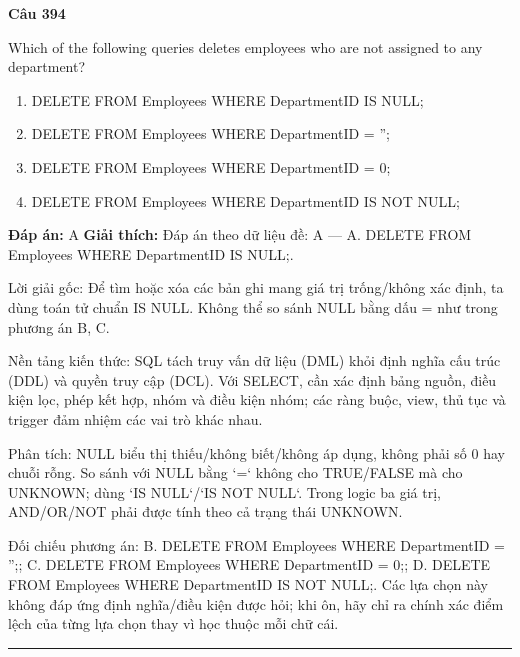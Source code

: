 \documentclass[11pt,a4paper]{article}
\newenvironment{question}[1]{%
  \par\vspace{1em}\noindent\textbf{\large Câu #1}\par\vspace{0.4em}
}{%
  \par\vspace{1em}\hrule\vspace{0.6em}
}
\newenvironment{choices}{%
  \begin{enumerate}[label=\textbf{\Alph*.},leftmargin=2.2em,itemsep=2pt,topsep=3pt]
}{%
  \end{enumerate}
}
\newcommand{\choice}{\item}
\begin{document}
\begin{question}{394}
Which of the following queries deletes employees who are not assigned to any department?
\begin{choices}
\choice DELETE FROM Employees WHERE DepartmentID IS NULL;
\choice DELETE FROM Employees WHERE DepartmentID = '';
\choice DELETE FROM Employees WHERE DepartmentID = 0;
\choice DELETE FROM Employees WHERE DepartmentID IS NOT NULL;
\end{choices}
\textbf{Đáp án:} A
\textbf{Giải thích:} Đáp án theo dữ liệu đề: A — A. DELETE FROM Employees WHERE DepartmentID IS NULL;.

Lời giải gốc: Để tìm hoặc xóa các bản ghi mang giá trị trống/không xác định, ta dùng toán tử chuẩn IS NULL. Không thể so sánh NULL bằng dấu = như trong phương án B, C.

Nền tảng kiến thức: SQL tách truy vấn dữ liệu (DML) khỏi định nghĩa cấu trúc (DDL) và quyền truy cập (DCL). Với SELECT, cần xác định bảng nguồn, điều kiện lọc, phép kết hợp, nhóm và điều kiện nhóm; các ràng buộc, view, thủ tục và trigger đảm nhiệm các vai trò khác nhau.

Phân tích: NULL biểu thị thiếu/không biết/không áp dụng, không phải số 0 hay chuỗi rỗng. So sánh với NULL bằng `=` không cho TRUE/FALSE mà cho UNKNOWN; dùng `IS NULL`/`IS NOT NULL`. Trong logic ba giá trị, AND/OR/NOT phải được tính theo cả trạng thái UNKNOWN.

Đối chiếu phương án: B. DELETE FROM Employees WHERE DepartmentID = '';; C. DELETE FROM Employees WHERE DepartmentID = 0;; D. DELETE FROM Employees WHERE DepartmentID IS NOT NULL;. Các lựa chọn này không đáp ứng định nghĩa/điều kiện được hỏi; khi ôn, hãy chỉ ra chính xác điểm lệch của từng lựa chọn thay vì học thuộc mỗi chữ cái.
\end{question}
\end{document}
